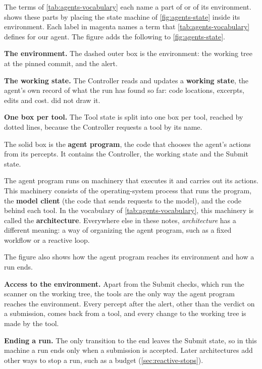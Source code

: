 The terms of \cref{tab:agents-vocabulary} each name a part of \msa{} or of its environment.
 shows these parts by placing the state machine of
\cref{fig:agents-state} inside its environment. Each label in magenta names a term that
\cref{tab:agents-vocabulary} defines for our agent. The figure adds the following to
\cref{fig:agents-state}.
\bi
\item \textbf{The environment.} The dashed outer box is the environment: the working tree at the
pinned commit, and the alert.
\item \textbf{The working state.} The Controller reads and updates a \textbf{working state}, the
agent's own record of what the run has found so far: code locations, excerpts, edits and cost.
 did not draw it.
\item \textbf{One box per tool.} The Tool state is split into one box per tool, reached by dotted
lines, because the Controller requests a tool by its name.
\ei

The solid box is the \textbf{agent program}, the code that chooses the agent's actions from its
percepts. It contains the Controller, the working state and the Submit state.

The agent program runs on machinery that executes it and carries out its actions. This machinery
consists of the operating-system process that runs the program, the \textbf{model client} (the code
that sends requests to the model), and the code behind each tool. In the vocabulary of
\cref{tab:agents-vocabulary}, this machinery is called the \textbf{architecture}. Everywhere else in
these notes, \emph{architecture} has a different meaning: a way of organizing the agent program,
such as a fixed workflow or a reactive loop.

The figure also shows how the agent program reaches its environment and how a run ends.
\bi
\item \textbf{Access to the environment.} Apart from the Submit checks, which run the scanner on
the working tree, the tools are the only way the agent program reaches the environment. Every
percept after the alert, other than the verdict on a submission, comes back from a tool, and every
change to the working tree is made by the  tool.
\item \textbf{Ending a run.} The only transition to the end leaves the Submit state, so in this
machine a run ends only when a submission is accepted. Later architectures add other ways to stop
a run, such as a budget (\cref{sec:reactive-stops}).
\ei

